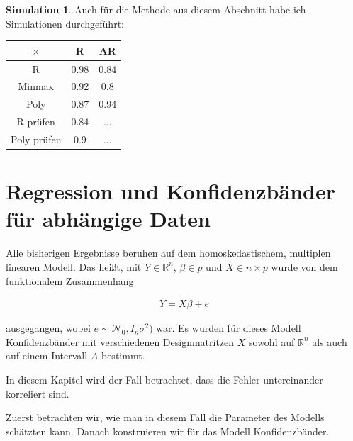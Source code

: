 \documentclass[12pt,a4paper]{article}
\theoremstyle{definition}
\theoremstyle{definition}
\theoremstyle{definition}
\newtheorem{Simulation}[Definition]{Simulation}
\newcommand{\UeberRR}{0.98}
\newcommand{\UeberRMinmax}{0.92}
\newcommand{\UeberRMinmaxPoly}{0.87}
\newcommand{\UeberARR}{0.84}
\newcommand{\UeberARMinmax}{0.8}
\newcommand{\UeberARMinmaxPoly}{0.94}
\newcommand{\UeberRRpruefen}{0.84}
\newcommand{\UeberRMinmaxPolypruefen}{0.9}
\newcommand{\UeberARRpruefen}{...}
\newcommand{\UeberARMinmaxPolypruefen}{...}
\begin{document}
\begin{Simulation}
Auch für die Methode aus diesem Abschnitt habe ich Simulationen durchgeführt:

\begin{center}
\begin{tabular}{|c|c|c|}
\hline 
$\times$ & R & AR \\ 
\hline 
R		& \UeberRR			& \UeberARR \\ 
\hline 
Minmax	& \UeberRMinmax	 	& \UeberARMinmax \\ 
\hline 
Poly 	& \UeberRMinmaxPoly & \UeberARMinmaxPoly \\ 
\hline 
R prüfen	& \UeberRRpruefen & \UeberARRpruefen \\ 
\hline 
Poly prüfen	& \UeberRMinmaxPolypruefen & \UeberARMinmaxPolypruefen \\ 
\hline 
\end{tabular} 
\end{center}

\end{Simulation}



\newpage
\section{Regression und Konfidenzbänder für abhängige Daten}
\label{Regression und Konfidenzbänder für abhaengige Daten}
Alle bisherigen Ergebnisse beruhen auf dem homoskedastischem, multiplen linearen Modell. Das heißt, mit $Y \in \mathbb{R}^n$, $\beta \in p$ und $X \in n \times p$ wurde von dem funktionalem Zusammenhang

\begin{align} \label{Grundmodell_AR}
Y = X \beta + e
\end{align}

ausgegangen, wobei $e \sim \mathscr{N}_0,I_n \sigma^2)$ war.  Es wurden für dieses Modell Konfidenzbänder mit verschiedenen Designmatritzen $X$ sowohl auf $\mathbb{R}^{n}$ als auch auf einem Intervall $A$ bestimmt.

In diesem Kapitel wird der Fall betrachtet, dass die Fehler untereinander korreliert sind. 

Zuerst betrachten wir, wie man in diesem Fall die Parameter des Modells schätzten kann. Danach konstruieren wir für das Modell Konfidenzbänder. 
\end{document}
